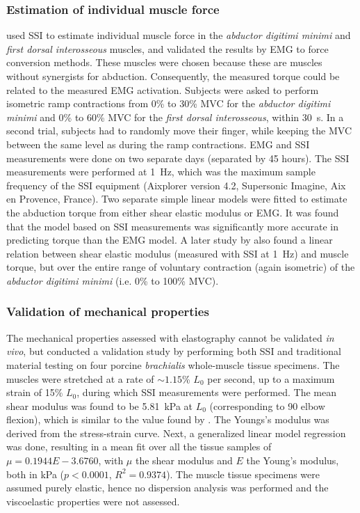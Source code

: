 \subsubsection{Estimation of individual muscle force}
\citet{bouillard_estimation_2011} used SSI to estimate individual muscle force in the \textit{abductor digitimi minimi} and \textit{first dorsal interosseous} muscles, and validated the results by EMG to force conversion methods. These muscles were chosen because these are muscles without synergists for abduction. Consequently, the measured torque could be related to the measured EMG activation. Subjects were asked to perform isometric ramp contractions from 0\% to 30\% MVC for the \textit{abductor digitimi minimi} and 0\% to 60\% MVC for the \textit{first dorsal interosseous}, within \SI{30}{\second}. In a second trial, subjects had to randomly move their finger, while keeping the MVC between the same level as during the ramp contractions. EMG and SSI measurements were done on two separate days (separated by 45 hours). The SSI measurements were performed at \SI{1}{\hertz}, which was the maximum sample frequency of the SSI equipment (Aixplorer version 4.2, Supersonic Imagine, Aix en Provence, France). Two separate simple linear models were fitted to estimate the abduction torque from either shear elastic modulus or EMG. It was found that the model based on SSI measurements was significantly more accurate in predicting torque than the EMG model. 
A later study by \citet{ates_muscle_2015} also found a linear relation between shear elastic modulus (measured with SSI at \SI{1}{\hertz}) and muscle torque, but over the entire range of voluntary contraction (again isometric) of the \textit{abductor digitimi minimi} (i.e. 0\% to 100\% MVC). 


\subsubsection{Validation of mechanical properties}
The mechanical properties assessed with elastography cannot be validated \textit{in vivo}, but \citet{eby_validation_2013} conducted a validation study by performing both SSI and traditional material testing on four porcine \textit{brachialis} whole-muscle tissue specimens. The muscles were stretched at a rate of $\sim{}1.15$\% $L_0$ per second, up to a maximum strain of 15\% $L_0$, during which SSI measurements were performed. The mean shear modulus was found to be \SI{5.81}{\kilo\pascal} at $L_0$ (corresponding to \SI{90}{\deg} elbow flexion), which is similar to the value found by \citet{gennisson_viscoelastic_2010}. The Youngs's modulus was derived from the stress-strain curve. Next, a generalized linear model regression was done, resulting in a mean fit over all the tissue samples of $\mu = 0.1944 E - 3.6760$, with $\mu$ the shear modulus and $E$ the Young's modulus, both in \si{\kilo\pascal} ($p<0.0001$, $R^2 = 0.9374$). The muscle tissue specimens were assumed purely elastic, hence no dispersion analysis was performed and the viscoelastic properties were not assessed.


